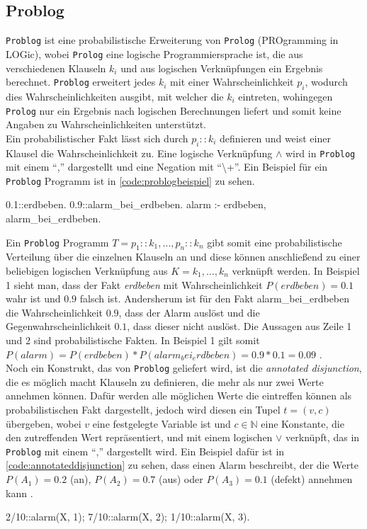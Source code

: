 \documentclass[german,version-2020-11]{uzl-thesis}
\begin{document}
\subsection{Problog}
\texttt{Problog} ist eine probabilistische Erweiterung von \texttt{Prolog} (PROgramming in LOGic), wobei \texttt{Prolog} eine logische Programmiersprache ist, die aus verschiedenen Klauseln $k_i$ und aus logischen Verknüpfungen ein Ergebnis berechnet. \texttt{Problog} erweitert jedes $k_i$ mit einer Wahrscheinlichkeit $p_i$, wodurch dies Wahrscheinlichkeiten ausgibt, mit welcher die $k_i$ eintreten, wohingegen \texttt{Prolog} nur ein Ergebnis nach logischen Berechnungen liefert und somit keine Angaben zu Wahrscheinlichkeiten unterstützt. \\  Ein probabilistischer Fakt lässt sich durch $p_i :: k_i$ definieren und weist einer Klausel die Wahrscheinlichkeit zu. Eine logische Verknüpfung $\land$ wird in \texttt{Problog} mit einem \enquote{,} dargestellt und eine Negation mit  \enquote{\textbackslash+}. Ein Beispiel für ein \texttt{Problog} Programm ist in \autoref{code:problogbeispiel} zu sehen.
\begin{Pseudocode}[caption={\texttt{Problog}-Beispiel}, label={code:problogbeispiel}, numbers=left]
0.1::erdbeben.
0.9::alarm_bei_erdbeben.
alarm :- erdbeben, alarm_bei_erdbeben.
\end{Pseudocode} 
Ein \texttt{Problog} Programm $T = {p_1 :: k_1, \dots, p_n :: k_n}$ gibt somit eine probabilistische Verteilung über die einzelnen Klauseln an und diese können anschließend zu einer beliebigen logischen Verknüpfung aus $K = {k_1 , \dots , k_n}$ verknüpft werden. In Beispiel 1 sieht man, dass der Fakt \textit{erdbeben} mit Wahrscheinlichkeit $ P(erdbeben) = 0.1$ wahr ist und $0.9$ falsch ist. Andersherum ist für den Fakt alarm\_bei\_erdbeben  die Wahrscheinlichkeit $0.9$, dass der Alarm auslöst und die Gegenwahrscheinlichkeit $0.1$, dass dieser nicht auslöst. Die Aussagen aus Zeile 1 und 2 sind probabilistische Fakten.  In Beispiel 1 gilt somit $P(alarm) = P(erdbeben) * P(alarm_bei_erdbeben) = 0.9 * 0.1 = 0.09$ \cite{4,5}. \\ 
Noch ein Konstrukt, das von \texttt{Problog} geliefert wird, ist die \textit{annotated disjunction}, die es möglich macht Klauseln zu definieren, die mehr als nur zwei Werte annehmen können. Dafür werden alle möglichen Werte die eintreffen können als probabilistischen Fakt dargestellt, jedoch wird diesen ein Tupel $t = (v,c) $ übergeben, wobei $v$ eine festgelegte Variable ist und $c \in \mathbb{N}$ eine Konstante, die den zutreffenden Wert repräsentiert, und  mit einem logischen $\lor$ verknüpft, das in \texttt{Problog} mit einem \enquote{,} dargestellt wird. Ein Beispiel dafür ist in \autoref{code:annotateddisjunction} zu sehen, dass einen Alarm beschreibt, der die Werte $P(A_1) = 0.2$ (an), $P(A_2) = 0.7$ (aus) oder $P(A_3) = 0.1$ (defekt) annehmen kann \cite{5}.
\begin{Pseudocode}[caption={\texttt{Problog}-Beispiel \textit{annotated disjunction}}, label={code:annotateddisjunction}, numbers=left]
2/10::alarm(X, 1); 7/10::alarm(X, 2); 1/10::alarm(X, 3).
\end{Pseudocode}
\end{document}
